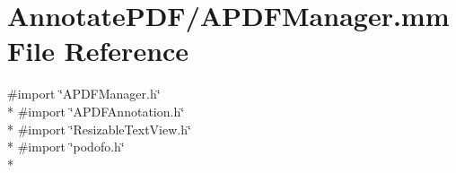 \hypertarget{_a_p_d_f_manager_8mm}{\section{Annotate\-P\-D\-F/\-A\-P\-D\-F\-Manager.mm File Reference}
\label{_a_p_d_f_manager_8mm}
}
{\ttfamily \#import \char`\"{}A\-P\-D\-F\-Manager.\-h\char`\"{}}\\*
{\ttfamily \#import \char`\"{}A\-P\-D\-F\-Annotation.\-h\char`\"{}}\\*
{\ttfamily \#import \char`\"{}Resizable\-Text\-View.\-h\char`\"{}}\\*
{\ttfamily \#import \char`\"{}podofo.\-h\char`\"{}}\\*
